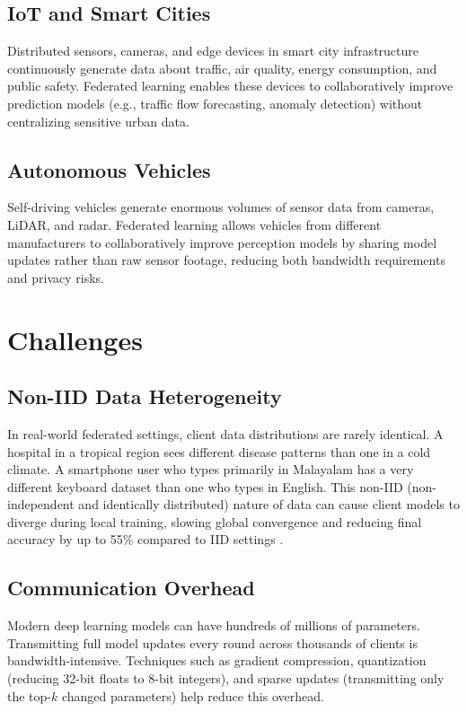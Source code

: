 \documentclass[conference]{IEEEtran}
\begin{document}
\subsection{IoT and Smart Cities}
Distributed sensors, cameras, and edge devices in smart city infrastructure continuously generate data about traffic, air quality, energy consumption, and public safety. Federated learning enables these devices to collaboratively improve prediction models (e.g., traffic flow forecasting, anomaly detection) without centralizing sensitive urban data.

\subsection{Autonomous Vehicles}
Self-driving vehicles generate enormous volumes of sensor data from cameras, LiDAR, and radar. Federated learning allows vehicles from different manufacturers to collaboratively improve perception models by sharing model updates rather than raw sensor footage, reducing both bandwidth requirements and privacy risks.

\section{Challenges}

\subsection{Non-IID Data Heterogeneity}
In real-world federated settings, client data distributions are rarely identical. A hospital in a tropical region sees different disease patterns than one in a cold climate. A smartphone user who types primarily in Malayalam has a very different keyboard dataset than one who types in English. This non-IID (non-independent and identically distributed) nature of data can cause client models to diverge during local training, slowing global convergence and reducing final accuracy by up to 55\% compared to IID settings \cite{zhao2018}.

\subsection{Communication Overhead}
Modern deep learning models can have hundreds of millions of parameters. Transmitting full model updates every round across thousands of clients is bandwidth-intensive. Techniques such as gradient compression, quantization (reducing 32-bit floats to 8-bit integers), and sparse updates (transmitting only the top-$k$ changed parameters) help reduce this overhead.
\end{document}
